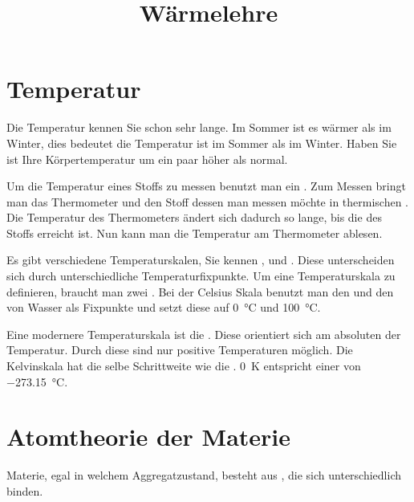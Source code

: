 \documentclass[12pt,a4paper,twoside]{article}
\title{Wärmelehre}
\date{}
\begin{document}
\maketitle




\section*{Temperatur}

\StartLueckentext

Die Temperatur kennen Sie schon sehr lange.
Im Sommer ist es wärmer als im Winter, dies bedeutet die Temperatur ist im Sommer  als im Winter.
Haben Sie  ist Ihre Körpertemperatur um ein paar  höher als normal.

Um die Temperatur eines Stoffs zu messen benutzt man ein .
Zum Messen bringt man das Thermometer und den Stoff dessen  man messen möchte in thermischen .
Die Temperatur des Thermometers ändert sich dadurch so lange, bis die  des Stoffs erreicht ist.
Nun kann man die Temperatur am Thermometer ablesen.

Es gibt verschiedene Temperaturskalen, Sie kennen ,  und .
Diese  unterscheiden sich durch unterschiedliche Temperaturfixpunkte.
Um eine Temperaturskala zu definieren, braucht man zwei . 
Bei der Celsius Skala benutzt man den  und den  von Wasser als Fixpunkte und setzt diese auf \SI{0}{\celsius} und \SI{100}{\celsius}.

Eine modernere Temperaturskala ist die . 
Diese orientiert sich am absoluten  der Temperatur.
Durch diese  sind nur positive Temperaturen möglich.
Die Kelvinskala hat die selbe Schrittweite wie die .
\SI{0}{K} entspricht einer  von \SI{-273.15}{\celsius}.

\StoppLueckentext

\newpage

\section*{Atomtheorie der Materie}
\StartLueckentext

Materie, egal in welchem Aggregatzustand, besteht aus , die sich unterschiedlich binden.
\end{document}
